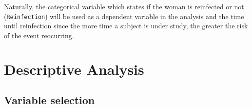 \documentclass[
]{article}
\begin{document}
Naturally, the categorical variable which states if the woman is reinfected or not (\texttt{Reinfection}) will be used as a dependent variable in the analysis and the time until reinfection since the more time a subject is under study, the greater the risk of the event reocurring.

\hypertarget{descriptive-analysis}{%
\section{Descriptive Analysis}\label{descriptive-analysis}}

\hypertarget{variable-selection}{%
\subsection{Variable selection}\label{variable-selection}}
\end{document}

